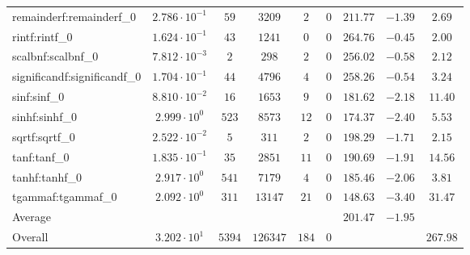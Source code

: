 \begin{tabular}{|l|c|c|c|c|c|c|c|c|}
remainderf:remainderf\_0     & $ 2.786 \cdot 10^{-1} $ & $ 59     $ & $ 3209   $ & $ 2   $ & $ 0   $ & $ 211.77      $ & $ -1.39   $ & $ 2.69    $ \\
rintf:rintf\_0               & $ 1.624 \cdot 10^{-1} $ & $ 43     $ & $ 1241   $ & $ 0   $ & $ 0   $ & $ 264.76      $ & $ -0.45   $ & $ 2.00    $ \\
scalbnf:scalbnf\_0           & $ 7.812 \cdot 10^{-3} $ & $ 2      $ & $ 298    $ & $ 2   $ & $ 0   $ & $ 256.02      $ & $ -0.58   $ & $ 2.12    $ \\
significandf:significandf\_0 & $ 1.704 \cdot 10^{-1} $ & $ 44     $ & $ 4796   $ & $ 4   $ & $ 0   $ & $ 258.26      $ & $ -0.54   $ & $ 3.24    $ \\
sinf:sinf\_0                 & $ 8.810 \cdot 10^{-2} $ & $ 16     $ & $ 1653   $ & $ 9   $ & $ 0   $ & $ 181.62      $ & $ -2.18   $ & $ 11.40   $ \\
sinhf:sinhf\_0               & $ 2.999 \cdot 10^{0}  $ & $ 523    $ & $ 8573   $ & $ 12  $ & $ 0   $ & $ 174.37      $ & $ -2.40   $ & $ 5.53    $ \\
sqrtf:sqrtf\_0               & $ 2.522 \cdot 10^{-2} $ & $ 5      $ & $ 311    $ & $ 2   $ & $ 0   $ & $ 198.29      $ & $ -1.71   $ & $ 2.15    $ \\
tanf:tanf\_0                 & $ 1.835 \cdot 10^{-1} $ & $ 35     $ & $ 2851   $ & $ 11  $ & $ 0   $ & $ 190.69      $ & $ -1.91   $ & $ 14.56   $ \\
tanhf:tanhf\_0               & $ 2.917 \cdot 10^{0}  $ & $ 541    $ & $ 7179   $ & $ 4   $ & $ 0   $ & $ 185.46      $ & $ -2.06   $ & $ 3.81    $ \\
tgammaf:tgammaf\_0           & $ 2.092 \cdot 10^{0}  $ & $ 311    $ & $ 13147  $ & $ 21  $ & $ 0   $ & $ 148.63      $ & $ -3.40   $ & $ 31.47   $ \\
\hline
Average                      & $                     $ & $        $ & $        $ & $     $ & $     $ & $ 201.47      $ & $ -1.95   $ & $         $ \\
\hline
Overall                      & $ 3.202 \cdot 10^{1}  $ & $ 5394   $ & $ 126347 $ & $ 184 $ & $ 0   $ & $             $ & $         $ & $ 267.98  $ \\
\hline
\end{tabular}
